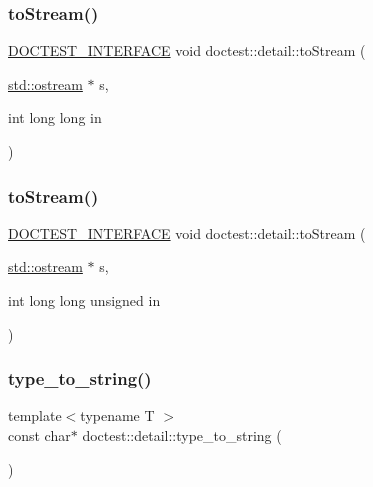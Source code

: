 \subsubsection{\texorpdfstring{to\+Stream()}{toStream()}\hspace{0.1cm}{\footnotesize\ttfamily [15/16]}}
{\footnotesize\ttfamily \mbox{\hyperlink{doctest_8h_a9c16ffc635ec47f07797d21ede26b1a5}{D\+O\+C\+T\+E\+S\+T\+\_\+\+I\+N\+T\+E\+R\+F\+A\+CE}} void doctest\+::detail\+::to\+Stream (\begin{DoxyParamCaption}\item[{\mbox{\hyperlink{doctest_8h_a116af65cb5e924b33ad9d9ecd7a783f3}{std\+::ostream}} $\ast$}]{s,  }\item[{int long long}]{in }\end{DoxyParamCaption})}

\mbox{\label{namespacedoctest_1_1detail_a22df719818a3df2b975ba0f7045cc8fd}} 
\subsubsection{\texorpdfstring{to\+Stream()}{toStream()}\hspace{0.1cm}{\footnotesize\ttfamily [16/16]}}
{\footnotesize\ttfamily \mbox{\hyperlink{doctest_8h_a9c16ffc635ec47f07797d21ede26b1a5}{D\+O\+C\+T\+E\+S\+T\+\_\+\+I\+N\+T\+E\+R\+F\+A\+CE}} void doctest\+::detail\+::to\+Stream (\begin{DoxyParamCaption}\item[{\mbox{\hyperlink{doctest_8h_a116af65cb5e924b33ad9d9ecd7a783f3}{std\+::ostream}} $\ast$}]{s,  }\item[{int long long unsigned}]{in }\end{DoxyParamCaption})}

\mbox{\label{namespacedoctest_1_1detail_a8ad4f98867561d1ca7865874a2f82d7e}} 
\subsubsection{\texorpdfstring{type\+\_\+to\+\_\+string()}{type\_to\_string()}}
{\footnotesize\ttfamily template$<$typename T $>$ \\
const char$\ast$ doctest\+::detail\+::type\+\_\+to\+\_\+string (\begin{DoxyParamCaption}{ }\end{DoxyParamCaption})}

